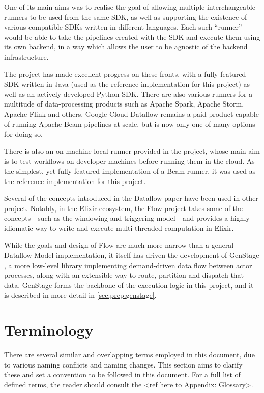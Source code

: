 One of its main aims was to realise the goal of allowing multiple interchangeable runners to be used from the same SDK, as well as supporting the existence of various compatible SDKs written in different languages.
Each such ``runner'' would be able to take the pipelines created with the SDK and execute them using its own backend, in a way which allows the user to be agnostic of the backend infrastructure.

The project has made excellent progress on these fronts, with a fully-featured SDK written in Java (used as the reference implementation for this project) as well as an actively-developed Python SDK.
There are also various runners for a multitude of data-processing products such as Apache Spark, Apache Storm, Apache Flink and others.
Google Cloud Dataflow remains a paid product capable of running Apache Beam pipelines at scale, but is now only one of many options for doing so.

There is also an on-machine local runner provided in the project, whose main aim is to test workflows on developer machines before running them in the cloud.
As the simplest, yet fully-featured implementation of a Beam runner, it was used as the reference implementation for this project.

Several of the concepts introduced in the Dataflow paper have been used in other project.
Notably, in the Elixir ecosystem, the Flow project \cite{ElixirFlow} takes some of the concepts---such as the windowing and triggering model---and provides a highly idiomatic way to write and execute multi-threaded computation in Elixir.

While the goals and design of Flow are much more narrow than a general Dataflow Model implementation, it itself has driven the development of GenStage \cite{ElixirGenStage}, a more low-level library implementing demand-driven data flow between actor processes, along with an extensible way to route, partition and dispatch that data.
GenStage forms the backbone of the execution logic in this project, and it is described in more detail in \cref{sec:prep:genstage}.

\section{Terminology}\label{sec:intro:terminology}

There are several similar and overlapping terms employed in this document, due to various naming conflicts and naming changes\footnotemark.
This section aims to clarify these and set a convention to be followed in this document.
For a full list of defined terms, the reader should consult the <ref here to Appendix: Glossary>.

